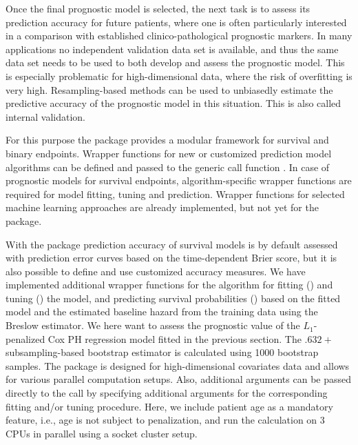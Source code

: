 \documentclass[]{jss}
\begin{document}
Once the final prognostic model is selected, the next task is to assess its prediction accuracy for future patients, where one is often particularly interested in a comparison with established clinico-pathological prognostic markers. In many applications no independent validation data set is available, and thus the same data set needs to be used to both develop and assess the prognostic model. This is especially problematic for high-dimensional data,
where the risk of overfitting is very high. Resampling-based methods can be used to unbiasedly estimate the predictive accuracy 
of the prognostic model in this situation. This is also called internal validation.

For this purpose the  package  \citep{Porz2009,peperr} provides a modular framework for survival and binary endpoints. %
Wrapper functions for new or customized prediction model algorithms can be defined and passed to the generic call function .  
In case of prognostic models for survival endpoints, algorithm-specific wrapper functions are required for model fitting, tuning and prediction. Wrapper functions for selected machine learning approaches are already implemented, but not yet for the  package.

With the  package prediction accuracy of survival models is by default assessed with prediction error curves based on the time-dependent Brier score, but it is also possible to define and use customized accuracy measures. We have implemented additional wrapper functions for the  algorithm for fitting () and tuning () the model, and predicting survival probabilities () based on the fitted model and the estimated baseline hazard from the training data using the Breslow estimator. We here want to assess the prognostic value of the $L_1$-penalized Cox PH regression model fitted in the previous section. The $.632+$ subsampling-based bootstrap estimator is calculated using 1000 bootstrap samples. The  package is designed for high-dimensional covariates data and allows for various parallel computation setups.
Also, additional arguments can be passed directly to the  call by specifying additional arguments for the corresponding fitting and/or tuning procedure.
Here, we include patient age as a mandatory feature, i.e., age is not subject to penalization, and 
run the calculation on 3 CPUs in parallel using a socket cluster setup. 
\end{document}
